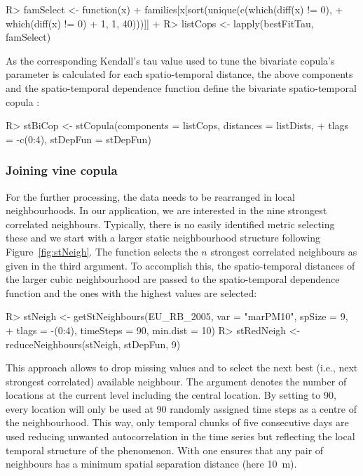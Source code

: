 \documentclass[article,nojss]{jss}
\begin{document}
\begin{Schunk}
\begin{Sinput}
R> famSelect <- function(x) {
+    families[x[sort(unique(c(which(diff(x) != 0),
+                             which(diff(x) != 0) + 1, 1, 40)))]]
+  }
R> listCops <- lapply(bestFitTau, famSelect)
\end{Sinput}
\end{Schunk}

As the corresponding Kendall's tau value used to tune the bivariate copula's parameter is calculated for each spatio-temporal distance, the above components and the spatio-temporal dependence function define the bivariate spatio-temporal copula :

\begin{Schunk}
\begin{Sinput}
R> stBiCop <- stCopula(components = listCops, distances = listDists, 
+                      tlags = -c(0:4), stDepFun = stDepFun)
\end{Sinput}
\end{Schunk}

\subsubsection{Joining vine copula}

For the further processing, the data needs to be rearranged in local neighbourhoods. In our application, we are interested in the nine strongest correlated neighbours. Typically, there is no easily identified metric selecting these and we start with a larger static neighbourhood structure following Figure~\ref{fig:stNeigh}. The function  selects the $n$ strongest correlated neighbours as given in the third argument. To accomplish this, the spatio-temporal distances of the larger cubic neighbourhood are passed to the spatio-temporal dependence function  and the ones with the highest values are selected: 
\begin{Schunk}
\begin{Sinput}
R> stNeigh <- getStNeighbours(EU_RB_2005, var = "marPM10", spSize = 9, 
+                             tlags = -(0:4), timeSteps = 90, min.dist = 10)
R> stRedNeigh <- reduceNeighbours(stNeigh, stDepFun, 9)
\end{Sinput}
\end{Schunk}
This approach allows to drop missing values and to select the next best (i.e., next strongest correlated) available neighbour. The argument  denotes the number of locations at the current level including the central location. By setting  to 90, every location will only be used at 90 randomly assigned time steps as a centre of the neighbourhood. This way, only temporal chunks of five consecutive days are used reducing unwanted autocorrelation in the time series but reflecting the local temporal structure of the phenomenon. With  one ensures that any pair of neighbours has a minimum spatial separation distance (here 10~m). 
\end{document}
